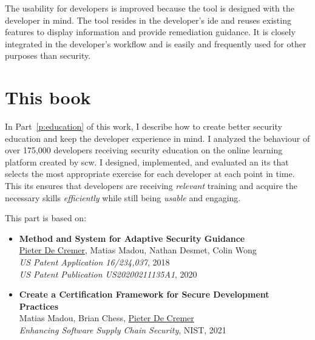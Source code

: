 The usability for developers is improved because the tool is designed with the developer in mind.  
The tool resides in the developer's \gls{ide} and reuses existing features to display information and provide remediation guidance.
It is closely integrated in the developer's workflow and is easily and frequently used for other purposes than security.

\section{This book}

In Part~\ref{p:education} of this work, I describe how to create better security education and keep the developer experience in mind.
I analyzed the behaviour of over 175,000 developers receiving security education on the online learning platform created by \gls{scw}. 
I designed, implemented, and evaluated an \gls{its} that selects the most appropriate exercise for each developer at each point in time.
This \gls{its} ensures that developers are receiving \textit{relevant} training and acquire the necessary skills \textit{efficiently} while still being \textit{usable} and engaging.

This part is based on:

\begin{itemize}
    \item 
    \textbf{Method and System for Adaptive Security Guidance}\\
    \underline{Pieter De Cremer}, Matias Madou, Nathan Desmet, Colin Wong\\
    \emph{US Patent Application 16/234,037}, 2018\\
    \emph{US Patent Publication US20200211135A1}, 2020
    \item 
    \textbf{Create a Certification Framework for Secure Development Practices}\\
    Matias Madou, Brian Chess, \underline{Pieter De Cremer}\\
    \emph{Enhancing Software Supply Chain Security}, NIST, 2021
\end{itemize}

